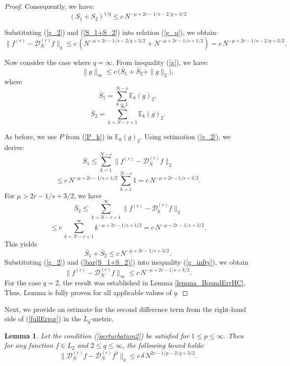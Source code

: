 \documentclass[10pt]{extarticle}
\newtheorem{lemma}[theorem]{Lemma}
\begin{document}
\begin{proof}
Consequently, we have:
\begin{equation}   \label{S_1+S_2}
(S_1+S_2)^{1/q} \le c\, N^{-\mu+2r-1/s-2/q+3/2}
\end{equation}

Substituting (\ref{g_2}) and (\ref{S_1+S_2}) into relation (\ref{g_q}), we obtain:
$$
\|f^{(r)}-\mathcal{D}_N^{(r)} f\|_{q} \leq
c\, (N^{-\mu+2r-1/s-2/q+3/2} + N^{-\mu+2r-1/s+1/2})
= c\, N^{-\mu+2r-1/s-2/q+3/2} .
$$

Now consider the case where $q=\infty$. From inequality (\ref{g}), we have:
\begin{equation}  \label{g_infty}
\|g\|_{\infty} \le c\,
\Big(\bar{S}_1 + \bar{S}_2 + \|g\|_{2}\Big) ,
\end{equation}
where
$$
\bar{S}_1 = \sum_{k=1}^{N-r} \mathbb{E}_k(g)_{2} ,
$$
$$
\bar{S}_2 = \sum_{k=N-r+1}^{\infty} \mathbb{E}_k(g)_{2} .
$$

As before, we use $P$ from (\ref{P_k}) in $\mathbb{E}_k(g)_{2}$.
Using estimation (\ref{g_2}), we derive:
$$
\bar{S}_1 \le \sum_{k=1}^{N-r} \|f^{(r)}-\mathcal{D}_N^{(r)} f\|_{2}
$$
$$
\le c\, N^{-\mu+2r-1/s+1/2}\, \sum_{k=1}^{N-r}  1
= c\, N^{-\mu+2r-1/s+3/2} .
$$
For $\mu>2r-1/s+3/2$, we have
$$
\bar{S}_2 \le \sum_{k=N-r+1}^{\infty}  \|f^{(r)}-\mathcal{D}_k^{(r)} f\|_{2}
$$
$$
\le c\, \sum_{k=N-r+1}^{\infty}  k^{-\mu+2r-1/s+1/2}
= c\, N^{-\mu+2r-1/s+3/2} .
$$
This yields
\begin{equation}   \label{bar(S_1+S_2)}
\bar{S}_1+\bar{S}_2 \le c\, N^{-\mu+2r-1/s+3/2} .
\end{equation}
Substituting (\ref{g_2}) and (\ref{bar(S_1+S_2)}) into inequality (\ref{g_infty}), we obtain
$$
\|f^{(r)}-\mathcal{D}_N^{(r)} f\|_{\infty} \leq
c\, N^{-\mu+2r-1/s+3/2} .
$$
For the case $q=2$, the result was established in Lemma \ref{lemma_BoundErrHC}. \\
Thus, Lemma is fully proven for all applicable values of $q$.
\end{proof}

Next, we provide an estimate for the second difference term from the right-hand side of (\ref{fullError})
in the $L_{q}$-metric.

\begin{lemma}\label{lemma_Bound2_L_q}
Let the condition (\ref{perturbation2}) be satisfied for $1\le p\le \infty$.
Then for any function $f\in L_{2}$ and $2\le q\le\infty$, the following bound holds:
$$
\|\mathcal{D}^{(r)}_N f - \mathcal{D}^{(r)}_N f^\delta\|_{q}
\leq c\,\delta\, N^{2r-1/p-2/q+3/2} .
$$
\end{lemma}
\end{document}
